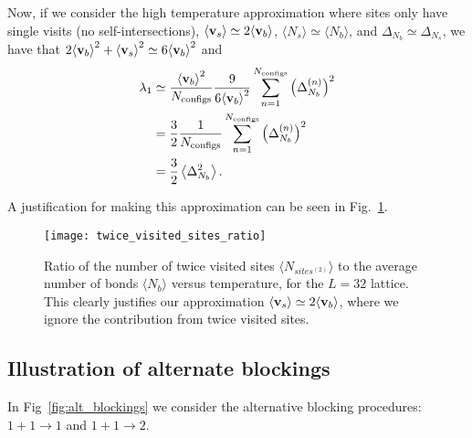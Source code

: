 \documentclass[../main.tex]{subfiles}
\begin{document}
Now, if we consider the high temperature approximation where sites only have
single visits (no self-intersections), ${\langle \mathbf{v}_s\rangle} \simeq 2{\langle \mathbf{v}_b\rangle}$, $\langle
N_s\rangle \simeq \langle N_b\rangle$, and $\Delta_{N_b} \simeq \Delta_{N_s}$,
we have that $2{\langle \mathbf{v}_b\rangle}^2 + {\langle \mathbf{v}_s\rangle}^2 \simeq 6{\langle \mathbf{v}_b\rangle}^2$ and
%
%
\begin{align}
    \lambda_1 &\simeq \frac{{\langle \mathbf{v}_b\rangle}^2}{N_{\mathrm{configs}}}\frac{9}{6{\langle \mathbf{v}_b\rangle}^2}
    \sum_{n=1}^{N_{\mathrm{configs}}} {\left(\Delta_{N_b}^{(n)}\right)}^2 \\
    &= \frac{3}{2}\frac{1}{N_{\mathrm{configs}}}\sum_{n=1}^{N_{\mathrm{configs}}}
    {\left(\Delta_{N_b}^{(n)}\right)}^2 \\
    &= \frac{3}{2}\left \langle \Delta_{N_b}^2 \right\rangle.
    \label{eq:eigval_delta_Nb2}
\end{align}
%

A justification for making this approximation can be seen in
Fig.~\ref{fig:twice_visited_sites_ratio}. 
%
%
\begin{figure}[htpb]
  \centering
  \texttt{[image: twice\_visited\_sites\_ratio]}
  \caption{Ratio of the number of twice visited sites $\langle
    N_{sites^{(2)}}\rangle$ to the average number of bonds $\langle N_b\rangle$
    versus temperature, for the $L=32$ lattice. This clearly justifies our
    approximation ${\langle \mathbf{v}_s\rangle} \simeq 2{\langle \mathbf{v}_b\rangle}$, where we ignore the contribution
  from twice visited sites.}%
\label{fig:twice_visited_sites_ratio}
\end{figure}
%
%

\subsection{Illustration of alternate blockings}%
\label{subsec:altb}
In Fig~\ref{fig:alt_blockings} we consider the alternative blocking procedures:
$1 + 1 \rightarrow 1$ and $1 + 1 \rightarrow 2$.
%
\end{document}

